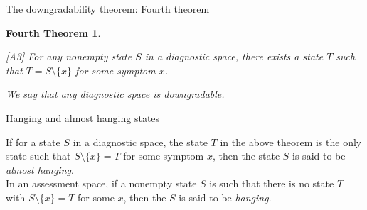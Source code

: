 \documentclass{beamer}
\newtheorem{fourththeorem}[theorem]{Fourth Theorem}
\begin{document}
\begin{frame}{The downgradability theorem: Fourth theorem}
\begin{fourththeorem} \begin{roster}
\item[{[A3]}] For any nonempty state $S$ in a diagnostic space, there exists a state $T$ such that 
$T = S\setminus\{x\}$ for some symptom $x$.
\end{roster}
We say that any diagnostic space is downgradable.  
\end{fourththeorem}
 \vspace{.5cm}

\end{frame}
\begin{frame}{Hanging and almost hanging states}
\center
\begin{minipage}{10cm}
\begin{definition} If for a state $S$ in a diagnostic space, the state $T$ in the above theorem is the only state such that $S\setminus \{x\} = T$ for some symptom $x$, then the state $S$ is said to be {\sl almost hanging}.\\[2mm]  In an assessment space, if a nonempty state $S$ is such that there is no state $T$ with $S\setminus \{x\} = T$ for some $x$, then the $S$ is said to be {\sl hanging}.
\end{definition}
\end{minipage}
 \vspace{.5cm}

\end{frame}
\end{document}
